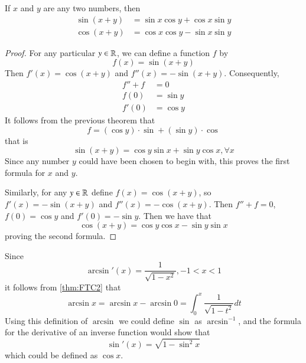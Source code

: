 \begin{theorem}
    If $x$ and $y$ are any two numbers, then \begin{align*}
        \sin(x+y) &= \sin x\cos y + \cos x \sin y \\
        \cos(x+y) &= \cos x\cos y - \sin x \sin y
    \end{align*}
\end{theorem}
\begin{proof}
    For any particular $y \in \mathbb R$, we can define a function $f$ by \begin{equation*}
        f(x) = \sin(x+y)
    \end{equation*}
    Then $f'(x) = \cos(x+y)$ and $f''(x) = -\sin(x+y)$. Consequently, \begin{align*}
        f'' + f &= 0 \\
        f(0) &= \sin y \\
        f'(0) &= \cos y
    \end{align*}
    It follows from the previous theorem that \begin{equation*}
        f = (\cos y)\cdot \sin + (\sin y) \cdot \cos
    \end{equation*}
    that is \begin{equation*}
        \sin(x+y) = \cos y\sin x+\sin y \cos x,\forall x
    \end{equation*}
    Since any number $y$ could have been chosen to begin with, this proves the first formula for $x$ and $y$.


    Similarly, for any $y \in \mathbb R$ define $f(x) = \cos(x+y)$, so $f'(x) = -\sin(x+y)$ and $f''(x) = -\cos(x+y)$. Then $f'' + f = 0$, $f(0) = \cos y$ and $f'(0) = -\sin y$. Then we have that \begin{equation*}
        \cos(x+y) = \cos y\cos x - \sin y \sin x
    \end{equation*}
    proving the second formula.
\end{proof}

\begin{remark}
    Since \begin{equation*}
        \arcsin'(x) = \frac{1}{\sqrt{1-x^2}}, -1 < x < 1
    \end{equation*}
    it follows from \ref{thm:FTC2} that \begin{equation*}
        \arcsin x = \arcsin x - \arcsin 0 = \int_0^x\frac{1}{\sqrt{1-t^2}}dt
    \end{equation*}
    Using this definition of $\arcsin$ we could define $\sin$ as $\arcsin^{-1}$, and the formula for the derivative of an inverse function would show that \begin{equation*}
        \sin'(x) = \sqrt{1-\sin^2 x}
    \end{equation*}
    which could be defined as $\cos x$.
\end{remark}

